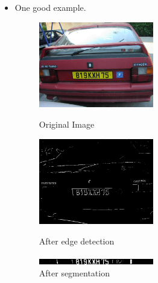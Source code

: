 \documentclass{article}
\begin{document}
\begin{spacing}{1.0}
\begin{itemize}
	\item One good example.
	\begin{figure}[H]
		\centering
		\begin{minipage}{5cm}
			\includegraphics[width=5cm]{P1010003.jpg}
			\caption{Original Image}
		\end{minipage}
		\begin{minipage}{5cm}
			\includegraphics[width=5cm]{P1010003_edge.jpg}
			\caption{After edge detection}
		\end{minipage}
		\begin{minipage}{5cm}
			\includegraphics[width=5cm]{P1010003_extract.jpg}
			\caption{After segmentation}
		\end{minipage}
	\end{figure}


\end{itemize}
\end{spacing}
\end{document}
